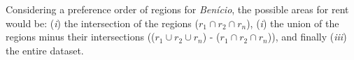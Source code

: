 \documentclass[runningheads,a4paper]{llncs}
\begin{document}
Considering a preference order of regions for \textit{Ben\'icio}, the possible areas for rent would be: (\textit{i}) the intersection of the regions ($r_1 \cap r_2 \cap r_n$), (\textit{i}) the union of the regions minus their intersections (($r_1 \cup r_2 \cup r_n$) - ($r_1 \cap r_2 \cap r_n$)), and finally (\textit{iii}) the entire dataset.



\end{document}
